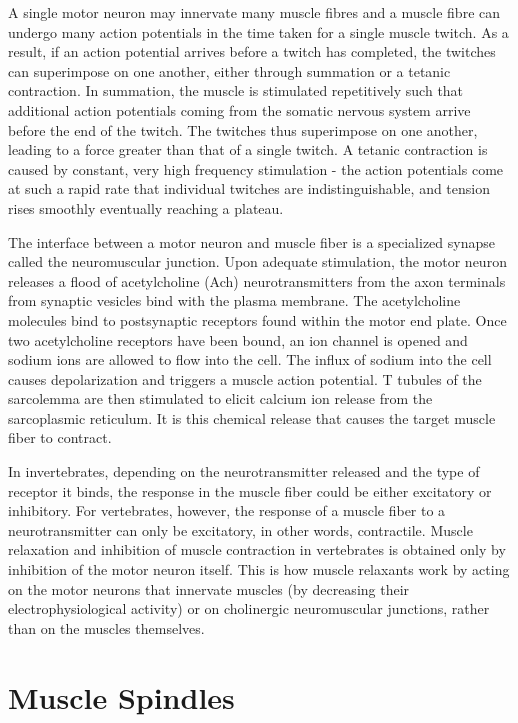 \documentclass[]{book}
\begin{document}
A single motor neuron may innervate many muscle fibres and a muscle fibre can undergo many action potentials in the time taken for a single muscle twitch. As a result, if an action potential arrives before a twitch has completed, the twitches can superimpose on one another, either through summation or a tetanic contraction. In summation, the muscle is stimulated repetitively such that additional action potentials coming from the somatic nervous system arrive before the end of the twitch. The twitches thus superimpose on one another, leading to a force greater than that of a single twitch. A tetanic contraction is caused by constant, very high frequency stimulation - the action potentials come at such a rapid rate that individual twitches are indistinguishable, and tension rises smoothly eventually reaching a plateau.

The interface between a motor neuron and muscle fiber is a specialized synapse called the neuromuscular junction. Upon adequate stimulation, the motor neuron releases a flood of acetylcholine (Ach) neurotransmitters from the axon terminals from synaptic vesicles bind with the plasma membrane. The acetylcholine molecules bind to postsynaptic receptors found within the motor end plate. Once two acetylcholine receptors have been bound, an ion channel is opened and sodium ions are allowed to flow into the cell. The influx of sodium into the cell causes depolarization and triggers a muscle action potential. T tubules of the sarcolemma are then stimulated to elicit calcium ion release from the sarcoplasmic reticulum. It is this chemical release that causes the target muscle fiber to contract.

In invertebrates, depending on the neurotransmitter released and the type of receptor it binds, the response in the muscle fiber could be either excitatory or inhibitory. For vertebrates, however, the response of a muscle fiber to a neurotransmitter can only be excitatory, in other words, contractile. Muscle relaxation and inhibition of muscle contraction in vertebrates is obtained only by inhibition of the motor neuron itself. This is how muscle relaxants work by acting on the motor neurons that innervate muscles (by decreasing their electrophysiological activity) or on cholinergic neuromuscular junctions, rather than on the muscles themselves.

\hypertarget{muscle-spindles}{%
\section{Muscle Spindles}\label{muscle-spindles}}
\end{document}

